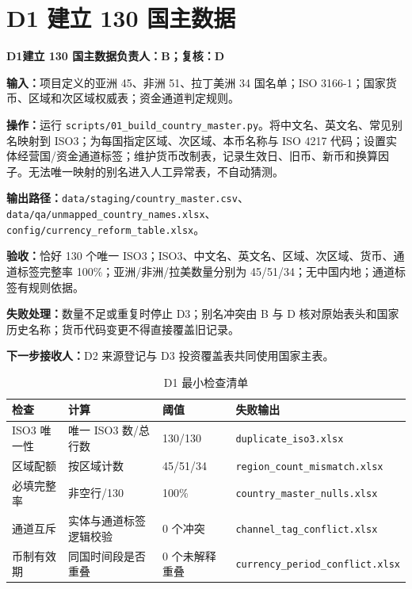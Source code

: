 \documentclass[UTF8,fontset=windows,12pt,openany]{ctexbook}
\newcommand{\File}[1]{{\small\begingroup\urlstyle{same}\nolinkurl{#1}\endgroup}}
\newcommand{\StepTitle}[3]{%
  \noindent\colorbox{DeepNavy}{\parbox{0.965\textwidth}{\color{white}\Large\bfseries #1\quad #2\hfill\normalsize #3}}\par\medskip
}
\newcommand{\CardRow}[2]{\noindent\textbf{#1：}#2\par}
\begin{document}
\section{D1 建立 130 国主数据}
\StepTitle{D1}{建立 130 国主数据}{负责人：B；复核：D}
\CardRow{输入}{项目定义的亚洲 45、非洲 51、拉丁美洲 34 国名单；ISO 3166-1；国家货币、区域和次区域权威表；资金通道判定规则。}
\CardRow{操作}{运行 \File{scripts/01_build_country_master.py}。将中文名、英文名、常见别名映射到 ISO3；为每国指定区域、次区域、本币名称与 ISO 4217 代码；设置实体经营国/资金通道标签；维护货币改制表，记录生效日、旧币、新币和换算因子。无法唯一映射的别名进入人工异常表，不自动猜测。}
\CardRow{输出路径}{\File{data/staging/country_master.csv}、\File{data/qa/unmapped_country_names.xlsx}、\File{config/currency_reform_table.xlsx}。}
\CardRow{验收}{恰好 130 个唯一 ISO3；ISO3、中文名、英文名、区域、次区域、货币、通道标签完整率 100\%；亚洲/非洲/拉美数量分别为 45/51/34；无中国内地；通道标签有规则依据。}
\CardRow{失败处理}{数量不足或重复时停止 D3；别名冲突由 B 与 D 核对原始表头和国家历史名称；货币代码变更不得直接覆盖旧记录。}
\CardRow{下一步接收人}{D2 来源登记与 D3 投资覆盖表共同使用国家主表。}

\begin{longtable}{p{3.2cm}p{3.1cm}p{3.0cm}p{4.0cm}}
\caption{D1 最小检查清单}\label{tab:d1-check}\\
\toprule
\textbf{检查} & \textbf{计算} & \textbf{阈值} & \textbf{失败输出}\\
\midrule
ISO3 唯一性 & 唯一 ISO3 数/总行数 & 130/130 & \File{duplicate_iso3.xlsx}\\
区域配额 & 按区域计数 & 45/51/34 & \File{region_count_mismatch.xlsx}\\
必填完整率 & 非空行/130 & 100\% & \File{country_master_nulls.xlsx}\\
通道互斥 & 实体与通道标签逻辑校验 & 0 个冲突 & \File{channel_tag_conflict.xlsx}\\
币制有效期 & 同国时间段是否重叠 & 0 个未解释重叠 & \File{currency_period_conflict.xlsx}\\
\bottomrule
\end{longtable}

\newpage
\end{document}
